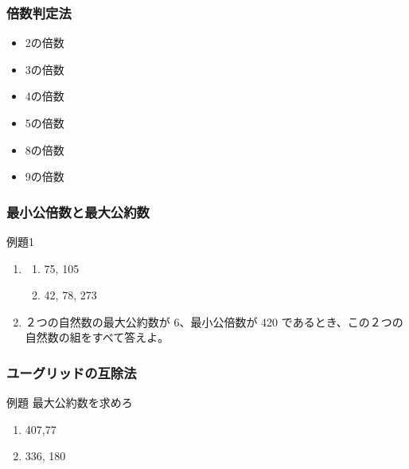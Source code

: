 \documentclass[10pt,dvipdfmx]{jsarticle}
\begin{document}
\subsubsection*{倍数判定法}
\begin{multicols}{2}
  \begin{itemize}
    \item 2の倍数
    \item 3の倍数
    \item 4の倍数
    \item 5の倍数
    \item 8の倍数
    \item 9の倍数
  \end{itemize}
\end{multicols}

\subsubsection*{最小公倍数と最大公約数}
\begin{itembox}[l]{例題1}
  \begin{enumerate}
    \item \begin{multicols}{2}
            \begin{large}
              \begin{enumerate}
                \item 75, 105
                \item 42, 78, 273
              \end{enumerate}
            \end{large}
          \end{multicols}
    \item
          ２つの自然数の最大公約数が 6、最小公倍数が 420 であるとき、この２つの自然数の組をすべて答えよ。
  \end{enumerate}
  \vspace{10mm}
\end{itembox}

\subsubsection*{ユーグリッドの互除法}
\begin{itembox}[l]{例題 最大公約数を求めろ}
  \begin{large}
    \begin{enumerate}
      \item 407,77\vspace{10mm}
      \item 336, 180\vspace{10mm}
    \end{enumerate}
  \end{large}
\end{itembox}
\end{document}
